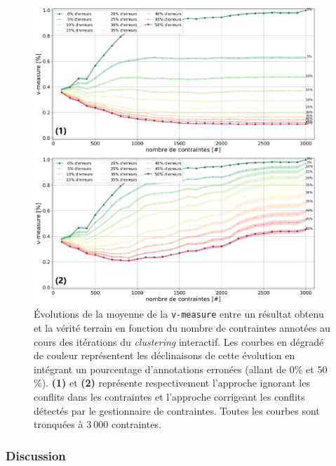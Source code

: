 			\begin{figure}[!htb]
				\centering
				\includegraphics[width=0.95\textwidth]{figures/etude-erreur-simulation-impact-closest}
				\caption{
					Évolutions de la moyenne de la \texttt{v-measure} entre un résultat obtenu et la vérité terrain en fonction du nombre de contraintes annotées au cours des itérations du \textit{clustering} interactif.
					Les courbes en dégradé de couleur représentent les déclinaisons de cette évolution en intégrant un pourcentage d'annotations erronées (allant de $0$\% et $50$\%).
					\textbf{(1)} et \textbf{(2)} représente respectivement l'approche ignorant les conflits dans les contraintes et l'approche corrigeant les conflits détectés par le gestionnaire de contraintes.
					Toutes les courbes sont tronquées à $3~000$ contraintes.
				}
				\label{figure:4.6.1-ETUDE-ROBUSTESSE-INTERETS-CORRECTION-ERREURS}
			\end{figure}
			

		\subsubsection{Discussion}
		
		
